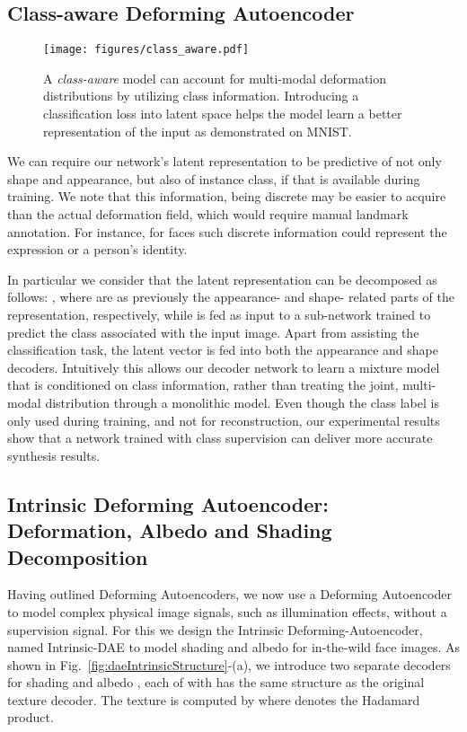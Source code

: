 \documentclass[runningheads]{llncs}
\begin{document}
\subsection{Class-aware Deforming Autoencoder}
\label{section:class-aware}
\label{class}
\begin{figure}[ht!]
 \vspace{-0.25cm}
    \centering
    \texttt{[image: figures/class\_aware.pdf]}
    \caption{A \emph{class-aware} model can account for multi-modal   deformation distributions by utilizing class
        information. Introducing a classification loss into latent space
        helps the model learn a better representation of the input as demonstrated on MNIST.}
    \label{fig:EncDecInject}
\end{figure}

 We can require our network's latent representation to be predictive of not only shape and appearance, but also of instance class, if that is available during training. We note that this information, being discrete may be  easier to acquire than the actual deformation field, which would require manual landmark annotation. For instance, for faces such discrete information could represent the expression or a person's identity. 
 
In particular we consider that the latent representation can be decomposed as follows:
, where  are as previously the appearance- and shape- related parts of the representation, respectively, while  is fed as input to a sub-network  trained to predict the class associated with the input image. Apart from assisting the classification task, the latent vector  is fed into both the appearance and shape decoders. 
Intuitively this allows our decoder network to learn a mixture model that is conditioned on class information,
rather than treating the joint, multi-modal distribution through a monolithic model. Even though the class label is only used during training, and not for reconstruction, our experimental results show that a network trained with class supervision can deliver more accurate synthesis results.

\subsection{Intrinsic Deforming Autoencoder: Deformation, Albedo and Shading  Decomposition}
\label{sec:idae}
Having outlined  Deforming Autoencoders, we now use a Deforming Autoencoder to  model complex physical image signals, such as illumination effects, without a supervision signal. For this we design the Intrinsic Deforming-Autoencoder, named Intrinsic-DAE to model shading and albedo for in-the-wild face images. As shown in Fig.~\ref{fig:daeIntrinsicStructure}-(a), we introduce two separate decoders for shading  and albedo , each of with has the same structure as the original texture decoder. The texture is computed by  where  denotes the Hadamard product. 
\end{document}
